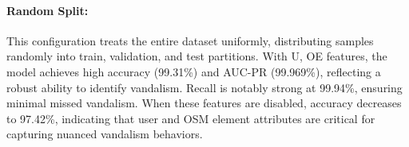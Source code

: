 \documentclass[
    13pt, %
    a4paper, %
    listof=totoc, %
    bibliography=totoc, %
    index=totoc, %
    headsepline
]{scrreprt}
\begin{document}
\begin{table}[htbp]
    \centering
    \renewcommand{\arraystretch}{1.3} %
    \captionsetup{font=small, labelfont=bf} %
    \caption{Vandalism detection performance for different data split types regarding accuracy, precision, recall, F1 score, AUC-PR, and ROC-AUC.\newline
    \smallskip
    \textit{Note: U, OE features indicate User and OSM Element features.}}
    \label{tab:vandalism_detection_final_clean}
    \vspace{1em}
\end{table}


\paragraph{Random Split:}
This configuration treats the entire dataset uniformly, distributing samples randomly into train, validation, and test partitions. With U, OE features, the model achieves high accuracy (99.31\%) and AUC-PR (99.969\%), reflecting a robust ability to identify vandalism. Recall is notably strong at 99.94\%, ensuring minimal missed vandalism. When these features are disabled, accuracy decreases to 97.42\%, indicating that user and OSM element attributes are critical for capturing nuanced vandalism behaviors.
\end{document}
